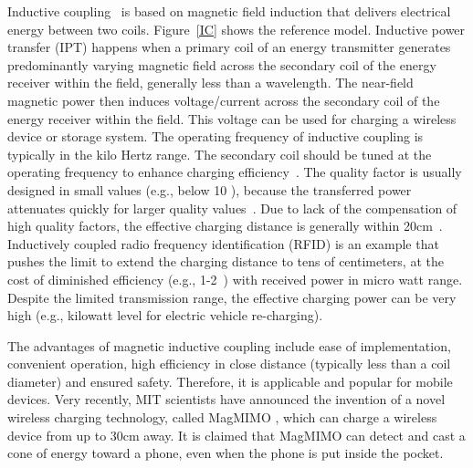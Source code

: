 \documentclass[twocolumn,10pt]{IEEEtran}
\begin{document}
Inductive coupling~\cite{WPC} is based on magnetic field induction that delivers electrical energy between two coils. Figure~\ref{IC} shows the reference model. 
Inductive power transfer (IPT) happens when a primary coil of an energy transmitter generates predominantly varying magnetic field across the secondary coil of the energy receiver within the field, generally less than a wavelength. The near-field magnetic power then induces voltage/current across the secondary coil of the energy receiver within the field. This voltage can be used for charging a wireless device or storage system.  
The operating frequency of inductive coupling is typically in the kilo Hertz range. The secondary coil should be tuned at the operating frequency to enhance charging efficiency~\cite{X.2014Wei}. The quality factor is usually designed in small values (e.g., below 10 \cite{S.2004Wang}), because the transferred power attenuates quickly for larger quality values~\cite{Z.2012Pantic}. Due to lack of the compensation of high quality factors, the effective charging distance is generally within 20cm~\cite{X.2014Wei}. Inductively coupled radio frequency identification (RFID) \cite{S.2008Ahson,L.2013Roselli} is an example that pushes the limit to extend the charging distance to tens of centimeters, at the cost of diminished efficiency (e.g., 1-2~\cite{A.2008Sample}) with received power in micro watt range. Despite the limited transmission range, the effective charging power can be very high (e.g., kilowatt level \cite{H2012Wu} for electric vehicle re-charging).

The advantages of magnetic inductive coupling include ease of implementation, convenient operation, high efficiency in close distance (typically less than a coil diameter) and ensured safety. Therefore, it is applicable and popular for mobile devices.
Very recently, MIT scientists have announced the invention of a novel wireless charging technology, called MagMIMO \cite{J.2014Jadidian}, which can charge a wireless device from up to 30cm away. It is claimed that MagMIMO can detect and cast a cone of energy toward a phone, even when the phone is put inside the pocket.   
\end{document}
